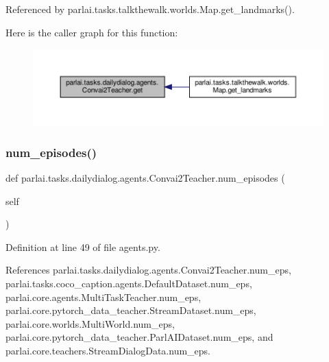 Referenced by parlai.\+tasks.\+talkthewalk.\+worlds.\+Map.\+get\+\_\+landmarks().

Here is the caller graph for this function\+:
\nopagebreak
\begin{figure}[H]
\begin{center}
\leavevmode
\includegraphics[width=350pt]{classparlai_1_1tasks_1_1dailydialog_1_1agents_1_1Convai2Teacher_a1d6018e0044b71bc4ceb789e302d66a4_icgraph}
\end{center}
\end{figure}
\mbox{\label{classparlai_1_1tasks_1_1dailydialog_1_1agents_1_1Convai2Teacher_a2e260f4477f6fd9ec11a1a1663e32bef}} 
\subsubsection{\texorpdfstring{num\+\_\+episodes()}{num\_episodes()}}
{\footnotesize\ttfamily def parlai.\+tasks.\+dailydialog.\+agents.\+Convai2\+Teacher.\+num\+\_\+episodes (\begin{DoxyParamCaption}\item[{}]{self }\end{DoxyParamCaption})}



Definition at line 49 of file agents.\+py.



References parlai.\+tasks.\+dailydialog.\+agents.\+Convai2\+Teacher.\+num\+\_\+eps, parlai.\+tasks.\+coco\+\_\+caption.\+agents.\+Default\+Dataset.\+num\+\_\+eps, parlai.\+core.\+agents.\+Multi\+Task\+Teacher.\+num\+\_\+eps, parlai.\+core.\+pytorch\+\_\+data\+\_\+teacher.\+Stream\+Dataset.\+num\+\_\+eps, parlai.\+core.\+worlds.\+Multi\+World.\+num\+\_\+eps, parlai.\+core.\+pytorch\+\_\+data\+\_\+teacher.\+Parl\+A\+I\+Dataset.\+num\+\_\+eps, and parlai.\+core.\+teachers.\+Stream\+Dialog\+Data.\+num\+\_\+eps.



